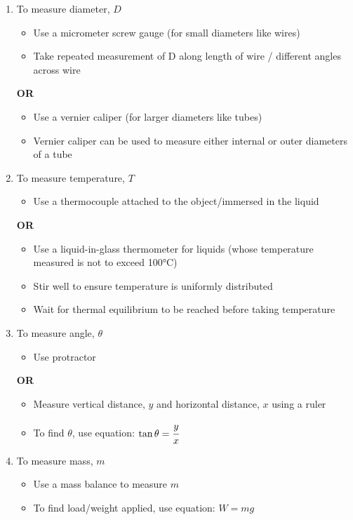 \documentclass{article}
\begin{document}
\begin{enumerate}
    \item To measure diameter, $D$
    \begin{itemize}
        \item 	Use a micrometer screw gauge (for small diameters like wires)
\item Take repeated measurement of D along length of wire / different angles across wire
    \end{itemize}
    \textbf{OR}
    \begin{itemize}
        \item Use a vernier caliper (for larger diameters like tubes)
\item Vernier caliper can be used to measure either internal or outer diameters of a tube
    \end{itemize}

    \item To measure temperature, $T$
    \begin{itemize}
        \item Use a thermocouple attached to the object/immersed in the liquid
    \end{itemize}
    \textbf{OR}
    \begin{itemize}
        \item Use a liquid-in-glass thermometer for liquids (whose temperature measured is not to exceed 100°C)
\item Stir well to ensure temperature is uniformly distributed
\item 	Wait for thermal equilibrium to be reached before taking temperature
    \end{itemize}
    
    \item To measure angle, $\theta$
    \begin{itemize}
        \item Use protractor
    \end{itemize}
    \textbf{OR}
    \begin{itemize}
        \item Measure vertical distance, $y$ and horizontal distance, $x$ using a ruler

\item To find $\theta$, use equation: $\tan \theta = \cfrac{y}{x}$
    \end{itemize}

\item To measure  mass, $m$
\begin{itemize}
    \item 	Use a mass balance to measure $m$
\item To find load/weight applied, use equation: $W = mg$
\end{itemize}


\end{enumerate}
\end{document}
